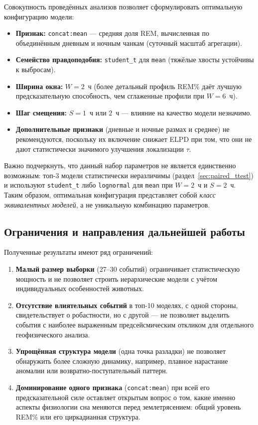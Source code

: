 \documentclass[14pt]{mmcs_article}
\begin{document}
Совокупность проведённых анализов позволяет сформулировать
оптимальную конфигурацию модели:

\begin{itemize}
	\item \textbf{Признак:} \texttt{concat:mean} — средняя доля
	REM, вычисленная по объединённым дневным и ночным
	чанкам (суточный масштаб агрегации).
	\item \textbf{Семейство правдоподобия:}
	\texttt{student\_t} для \texttt{mean} (тяжёлые
	хвосты устойчивы к выбросам).
	\item \textbf{Ширина окна:} $W = 2$~ч (более детальный
	профиль REM\% даёт лучшую предсказательную
	способность, чем сглаженные профили при $W = 6$~ч).
	\item \textbf{Шаг смещения:} $S = 1$~ч или $2$~ч —
	влияние на качество модели незначимо.
	\item \textbf{Дополнительные признаки} (дневные и ночные размах и среднее) не рекомендуются,
	поскольку их включение снижает ELPD при том, что
	они не дают статистически значимого улучшения
	локализации $\tau$.
\end{itemize}

Важно подчеркнуть, что данный набор параметров не является
единственно возможным: топ-3 модели статистически
неразличимы (раздел~\ref{sec:paired_ttest}) и используют
\texttt{student\_t} либо \texttt{lognormal} для
\texttt{mean} при $W = 2$~ч и $S = 2$~ч. Таким образом,
оптимальная конфигурация представляет собой \textit{класс
	эквивалентных моделей}, а не уникальную комбинацию
параметров.

\subsection*{Ограничения и направления дальнейшей работы}

Полученные результаты имеют ряд ограничений:

\begin{enumerate}
	\item \textbf{Малый размер выборки} (27--30 событий)
	ограничивает статистическую мощность и не
	позволяет строить иерархические модели с учётом
	индивидуальных особенностей животных.
	
	\item \textbf{Отсутствие влиятельных событий} в топ-10
	моделях, с одной стороны, свидетельствует о
	робастности, но с другой — не позволяет выделить
	события с наиболее выраженным предсейсмическим
	откликом для отдельного геофизического анализа.
	
	\item \textbf{Упрощённая структура модели} (одна точка
	разладки) не позволяет обнаружить более сложную
	динамику, например, плавное нарастание аномалии
	или возвратно-поступательный паттерн.
	
	\item \textbf{Доминирование одного признака}
	(\texttt{concat:mean}) при всей его
	предсказательной силе оставляет открытым вопрос о
	том, какие именно аспекты физиологии сна меняются
	перед землетрясением: общий уровень REM\% или его
	циркадианная структура.
\end{enumerate}
\end{document}
